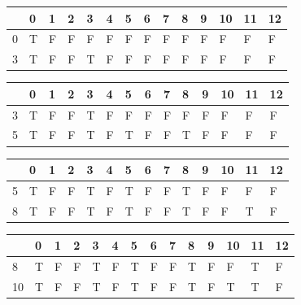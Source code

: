\documentclass[12pt]{extarticle}
\begin{document}
\begin{center}
\begin{tabular}{| m{0.6cm} | m{0.6cm}| m{0.6cm} | m{0.6cm} | m{0.6cm} | m{0.6cm} | m{0.6cm} | m{0.6cm} | m{0.6cm}| m{0.6cm} | m{0.6cm} | m{0.6cm} | m{0.6cm} | m{0.6cm} |}
 \hline
 & 0 & 1 & 2 & 3 & 4 & 5 & 6 & 7 & 8 & 9 & 10 & 11 & 12\\
 \hline
0 & T & F & F & F & F & F & F & F & F & F & F & F & F\\
\hline
3 & T & F & F & T & F & F & F & F & F & F & F & F & F\\
\hline
\end{tabular}
\end{center}

\begin{center}
\begin{tabular}{| m{0.6cm} | m{0.6cm}| m{0.6cm} | m{0.6cm} | m{0.6cm} | m{0.6cm} | m{0.6cm} | m{0.6cm} | m{0.6cm}| m{0.6cm} | m{0.6cm} | m{0.6cm} | m{0.6cm} | m{0.6cm} |}
 \hline
 & 0 & 1 & 2 & 3 & 4 & 5 & 6 & 7 & 8 & 9 & 10 & 11 & 12\\
 \hline
3 & T & F & F & T & F & F & F & F & F & F & F & F & F\\
\hline
5 & T & F & F & T & F & T & F & F & T & F & F & F & F\\
\hline
\end{tabular}
\end{center}

\begin{center}
\begin{tabular}{| m{0.6cm} | m{0.6cm}| m{0.6cm} | m{0.6cm} | m{0.6cm} | m{0.6cm} | m{0.6cm} | m{0.6cm} | m{0.6cm}| m{0.6cm} | m{0.6cm} | m{0.6cm} | m{0.6cm} | m{0.6cm} |}
 \hline
 & 0 & 1 & 2 & 3 & 4 & 5 & 6 & 7 & 8 & 9 & 10 & 11 & 12\\
 \hline
5 & T & F & F & T & F & T & F & F & T & F & F & F & F\\
\hline
8 & T & F & F & T & F & T & F & F & T & F & F & T & F\\
\hline
\end{tabular}
\end{center}

\begin{center}
\begin{tabular}{| m{0.6cm} | m{0.6cm}| m{0.6cm} | m{0.6cm} | m{0.6cm} | m{0.6cm} | m{0.6cm} | m{0.6cm} | m{0.6cm}| m{0.6cm} | m{0.6cm} | m{0.6cm} | m{0.6cm} | m{0.6cm} |}
 \hline
 & 0 & 1 & 2 & 3 & 4 & 5 & 6 & 7 & 8 & 9 & 10 & 11 & 12\\
 \hline
8 & T & F & F & T & F & T & F & F & T & F & F & T & F\\
\hline
10 & T & F & F & T & F & T & F & F & T & F & T & T & F\\
\hline
\end{tabular}
\end{center}
\end{document}
